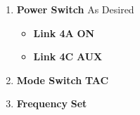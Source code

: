 \documentclass[fontInter]{TechCheck}
\begin{document}
\begin{listlongtable}
\begin{minipage}[t]{\linewidth}
			\vspace{-7pt}
			\begin{enumerate}
				\item \textbf{Power Switch} \dotfill As Desired
				\begin{itemize}
					\item \textbf{Link 4A} \dotfill \textbf{ON}
					\item \textbf{Link 4C} \dotfill \textbf{AUX}
				\end{itemize}
				\item \textbf{Mode Switch} \dotfill \textbf{TAC}
				\item \textbf{Frequency} \dotfill \textbf{Set}
			\end{enumerate}
		\end{minipage} \\
	\end{listlongtable}
\end{document}
